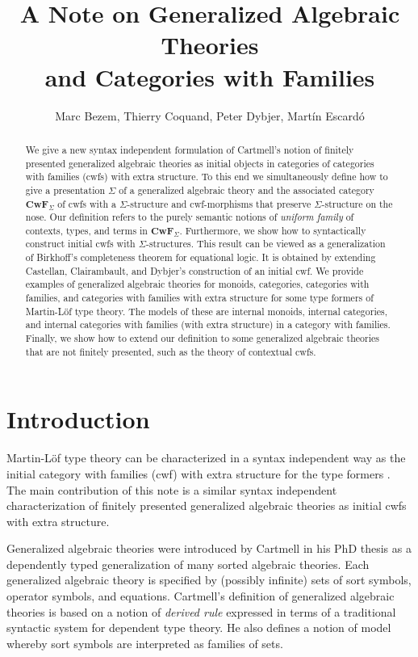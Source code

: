 \documentclass{lmcs}
\title[Generalized Algebraic Theories and Categories with Families]{A Note on Generalized Algebraic Theories\\and Categories with Families}\author{Marc Bezem, Thierry Coquand, Peter Dybjer, Mart\'in Escard\'o}
\newcommand{\FYI}[1]{{\color{red}#1}}
\def\Cwf{\mathbf{CwF}}
\begin{document}
\maketitle

\begin{abstract}
We give a new syntax independent formulation of Cartmell's notion of finitely presented generalized algebraic theories as initial objects in categories of categories with families (cwfs) with extra structure.
To this end we simultaneously define how to \FYI{give a presentation} $\Sigma$ of a generalized algebraic theory and the associated category $\Cwf_\Sigma$ of cwfs with a $\Sigma$-structure and cwf-morphisms that preserve $\Sigma$-structure on the nose.  Our definition refers to the purely semantic notions of {\em uniform family} of contexts, types, and terms in $\Cwf_\Sigma$. Furthermore, we show how to syntactically construct initial cwfs with $\Sigma$-structures. This result can be viewed as a generalization of Birkhoff's completeness theorem for equational logic. It is obtained by extending Castellan, Clairambault, and Dybjer's construction of an initial cwf. We provide examples of generalized algebraic theories for monoids, categories, categories with families, and categories with families with extra structure for some type formers of Martin-Löf type theory. The models of these are internal monoids, internal categories, and internal categories with families (with extra structure) in a category with families. Finally, we show how to extend our definition to some generalized algebraic theories that are not finitely presented, such as the theory of contextual cwfs.
\end{abstract}

\section{Introduction}

Martin-Löf type theory can be characterized in a syntax independent way as the initial category with families (cwf)  with extra structure for the type formers \cite{castellan:tlca2015,castellan:lmcs}. The main contribution of this note is a similar syntax independent characterization of finitely presented generalized algebraic theories as initial cwfs with extra structure.

Generalized algebraic theories were introduced by Cartmell in his PhD thesis \cite{cartmell:phd} as a dependently typed generalization of many sorted algebraic theories. Each generalized algebraic theory is specified by \FYI{ (possibly infinite) sets of sort symbols, operator symbols, and equations}. Cartmell's definition of generalized algebraic theories \cite{cartmell:phd,cartmell:apal} is based on a notion of {\em derived rule} expressed in terms of a traditional syntactic system for dependent type theory. He also defines a notion of model whereby sort symbols are interpreted as families of sets.
\end{document}
